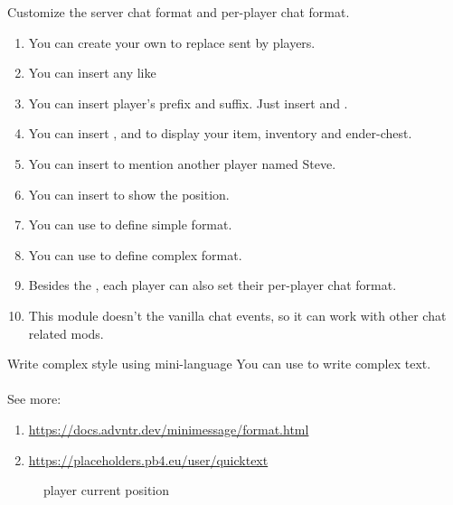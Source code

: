 Customize the server chat format and per-player chat format.


\begin{enumerate}
    \item You can create your own  to replace  sent by players.
    \item You can insert any  like 
    \item {You can insert player's prefix and suffix. Just insert  and .}
    \item You can insert ,  and  to display your item, inventory and ender-chest.
    \item You can insert  to mention another player named Steve.
    \item You can insert  to show the position.
    \item You can use  to define simple format.
    \item You can use  to define complex format.
    \item Besides the , each player can also set their per-player chat format.
    \item This module doesn't  the vanilla chat events, so it can work with other chat related mods.
\end{enumerate}

\begin{tips}{Write complex style using mini-language}
    You can use  to write complex text.\\
    \\
    See more:
    \begin{enumerate}
        \item \url{https://docs.advntr.dev/minimessage/format.html}
        \item \url{https://placeholders.pb4.eu/user/quicktext}
    \end{enumerate}
\end{tips}

\begin{description}
    \item[] player current position
\end{description}

